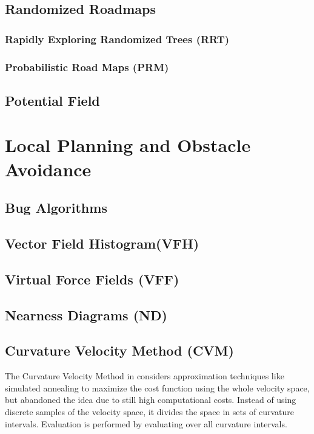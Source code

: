\subsection{Randomized Roadmaps}
\subsubsection{Rapidly Exploring Randomized Trees (RRT)}
\subsubsection{Probabilistic Road Maps (PRM)}
\subsection{Potential Field}
\section{Local Planning and Obstacle Avoidance}\label{sec:local}
\subsection{Bug Algorithms}
\subsection{Vector Field Histogram(VFH)}
\subsection{Virtual Force Fields (VFF)}
\subsection{Nearness Diagrams (ND)}
\subsection{Curvature Velocity Method (CVM)}
The Curvature Velocity Method in \cite{simmons1996curvature} considers approximation techniques like simulated annealing to maximize the cost function using the whole velocity space, but abandoned the idea due to still high computational costs. 
Instead of using discrete samples of the velocity space, it divides the space in sets of curvature intervals. 
Evaluation is performed by evaluating over all curvature intervals.

